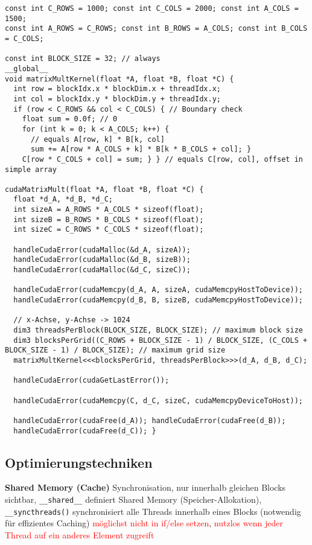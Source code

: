 \begin{lstlisting}
const int C_ROWS = 1000; const int C_COLS = 2000; const int A_COLS = 1500;
const int A_ROWS = C_ROWS; const int B_ROWS = A_COLS; const int B_COLS = C_COLS;

const int BLOCK_SIZE = 32; // always
__global__
void matrixMultKernel(float *A, float *B, float *C) {
  int row = blockIdx.x * blockDim.x + threadIdx.x;
  int col = blockIdx.y * blockDim.y + threadIdx.y;
  if (row < C_ROWS && col < C_COLS) { // Boundary check
  	float sum = 0.0f; // 0
  	for (int k = 0; k < A_COLS; k++) {
  	  // equals A[row, k] * B[k, col]
      sum += A[row * A_COLS + k] * B[k * B_COLS + col]; }
  	C[row * C_COLS + col] = sum; } } // equals C[row, col], offset in simple array

cudaMatrixMult(float *A, float *B, float *C) {
  float *d_A, *d_B, *d_C;
  int sizeA = A_ROWS * A_COLS * sizeof(float);
  int sizeB = B_ROWS * B_COLS * sizeof(float);
  int sizeC = C_ROWS * C_COLS * sizeof(float);

  handleCudaError(cudaMalloc(&d_A, sizeA));
  handleCudaError(cudaMalloc(&d_B, sizeB));
  handleCudaError(cudaMalloc(&d_C, sizeC));

  handleCudaError(cudaMemcpy(d_A, A, sizeA, cudaMemcpyHostToDevice));
  handleCudaError(cudaMemcpy(d_B, B, sizeB, cudaMemcpyHostToDevice));

  // x-Achse, y-Achse -> 1024
  dim3 threadsPerBlock(BLOCK_SIZE, BLOCK_SIZE); // maximum block size
  dim3 blocksPerGrid((C_ROWS + BLOCK_SIZE - 1) / BLOCK_SIZE, (C_COLS + BLOCK_SIZE - 1) / BLOCK_SIZE); // maximum grid size
  matrixMultKernel<<<blocksPerGrid, threadsPerBlock>>>(d_A, d_B, d_C);

  handleCudaError(cudaGetLastError());

  handleCudaError(cudaMemcpy(C, d_C, sizeC, cudaMemcpyDeviceToHost));

  handleCudaError(cudaFree(d_A)); handleCudaError(cudaFree(d_B));
  handleCudaError(cudaFree(d_C)); }
\end{lstlisting}

\subsection{Optimierungstechniken}

\textbf{Shared Memory (Cache)} Synchronisation, nur innerhalb gleichen Blocks sichtbar, \lstinline{__shared__} definiert Shared Memory (Speicher-Allokation), \lstinline{__syncthreads()} synchronisiert alle Threads innerhalb eines Blocks (notwendig für effizientes Caching) \textcolor{red}{möglichst nicht in if/else setzen}, \textcolor{red}{nutzlos wenn jeder Thread auf ein anderes Element zugreift}

